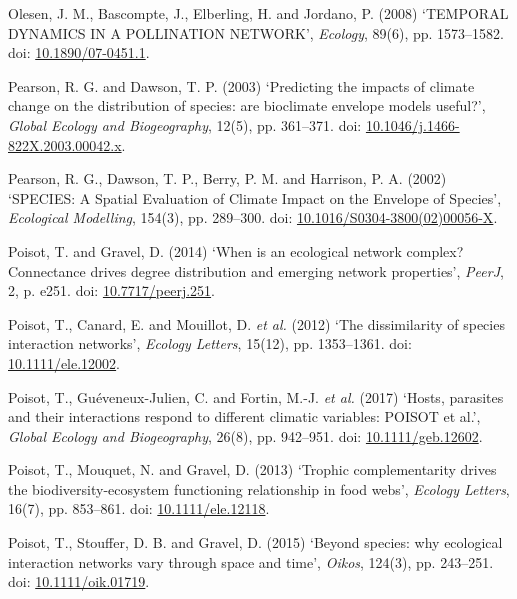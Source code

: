 \documentclass[12pt]{article}
\begin{document}
\hypertarget{ref-oles08tdpb}{}
Olesen, J. M., Bascompte, J., Elberling, H. and Jordano, P. (2008)
`TEMPORAL DYNAMICS IN A POLLINATION NETWORK', \emph{Ecology}, 89(6), pp.
1573--1582. doi:
\href{https://doi.org/10.1890/07-0451.1}{10.1890/07-0451.1}.

\hypertarget{ref-pear03pic}{}
Pearson, R. G. and Dawson, T. P. (2003) `Predicting the impacts of
climate change on the distribution of species: are bioclimate envelope
models useful?', \emph{Global Ecology and Biogeography}, 12(5), pp.
361--371. doi:
\href{https://doi.org/10.1046/j.1466-822X.2003.00042.x}{10.1046/j.1466-822X.2003.00042.x}.

\hypertarget{ref-pear02sse}{}
Pearson, R. G., Dawson, T. P., Berry, P. M. and Harrison, P. A. (2002)
`SPECIES: A Spatial Evaluation of Climate Impact on the Envelope of
Species', \emph{Ecological Modelling}, 154(3), pp. 289--300. doi:
\href{https://doi.org/10.1016/S0304-3800(02)00056-X}{10.1016/S0304-3800(02)00056-X}.

\hypertarget{ref-pois14wen}{}
Poisot, T. and Gravel, D. (2014) `When is an ecological network complex?
Connectance drives degree distribution and emerging network properties',
\emph{PeerJ}, 2, p. e251. doi:
\href{https://doi.org/10.7717/peerj.251}{10.7717/peerj.251}.

\hypertarget{ref-pois12dsi}{}
Poisot, T., Canard, E. and Mouillot, D. \emph{et al.} (2012) `The
dissimilarity of species interaction networks', \emph{Ecology Letters},
15(12), pp. 1353--1361. doi:
\href{https://doi.org/10.1111/ele.12002}{10.1111/ele.12002}.

\hypertarget{ref-pois17hpt}{}
Poisot, T., Guéveneux-Julien, C. and Fortin, M.-J. \emph{et al.} (2017)
`Hosts, parasites and their interactions respond to different climatic
variables: POISOT et al.', \emph{Global Ecology and Biogeography},
26(8), pp. 942--951. doi:
\href{https://doi.org/10.1111/geb.12602}{10.1111/geb.12602}.

\hypertarget{ref-pois13tcd}{}
Poisot, T., Mouquet, N. and Gravel, D. (2013) `Trophic complementarity
drives the biodiversity-ecosystem functioning relationship in food
webs', \emph{Ecology Letters}, 16(7), pp. 853--861. doi:
\href{https://doi.org/10.1111/ele.12118}{10.1111/ele.12118}.

\hypertarget{ref-pois15swe}{}
Poisot, T., Stouffer, D. B. and Gravel, D. (2015) `Beyond species: why
ecological interaction networks vary through space and time',
\emph{Oikos}, 124(3), pp. 243--251. doi:
\href{https://doi.org/10.1111/oik.01719}{10.1111/oik.01719}.
\end{document}
